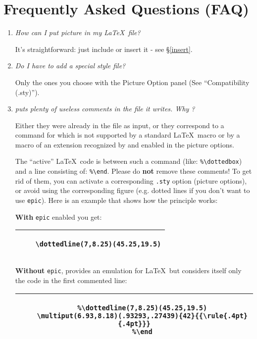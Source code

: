 \documentclass[11pt,a4paper]{article}
\begin{document}
\section{Frequently Asked Questions (FAQ)} \label{faq}
%
\begin{enumerate}
%
\item
{\em How can I put {\TC} picture in my \LaTeX\, file?}

It's straightforward: just include or insert it - see \S \ref{insert}.

\item
{\em Do I have to add a special style file? }

Only the ones you choose with the Picture Option panel
(See ``Compatibility (.sty)'').


\item
\label{tccommands}
{\em {\TC} puts plenty of useless comments in the file it writes. Why ?}

Either they were already in the file as input, or they correspond
to a command for {\TC} which is not supported by a standard \LaTeX\, macro
or by a macro of an extension recognized by {\TC} and enabled in the picture options.

The ``active'' \LaTeX\, code is between such a command (like: \verb+%\dottedbox+)
and a line
consisting of: \verb+%\end+. Please do {\bf not} remove these comments!
To get rid of them, you can activate a corresponding {\tt .sty} option
(picture options), or avoid using the corresponding figure (e.g.
dotted lines if you don't want to use {\tt epic}). Here is an example that shows
how the principle works:

{\bf With} {\tt epic} enabled you get:
  \begin{center}\footnotesize{
    \begin{tabular}{|c|}
    \hline
    \begin{minipage}[t]{0.75\linewidth}
    \begin{verbatim}
    \dottedline(7,8.25)(45.25,19.5)
    \end{verbatim}
    \end{minipage}\\
    \hline
    \end{tabular}
  }\end{center}
{\bf Without} {\tt epic}, {\TC} provides an emulation
for \LaTeX\, but considers itself only the code
in the first commented line:
  \begin{center}\footnotesize{
    \begin{tabular}{|c|}
    \hline
    \begin{minipage}[t]{0.75\linewidth}
    \begin{verbatim}
    %\dottedline(7,8.25)(45.25,19.5)
    \multiput(6.93,8.18)(.93293,.27439){42}{{\rule{.4pt}{.4pt}}}
    %\end
    \end{verbatim}
    \end{minipage}\\
    \hline
    \end{tabular}
  }\end{center}


\end{enumerate}
\end{document}
